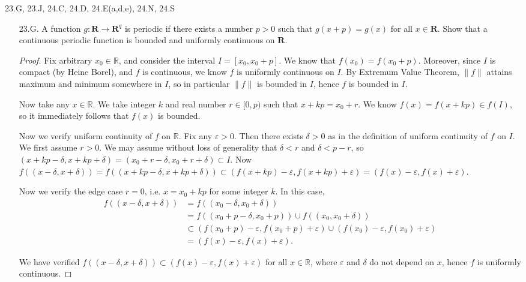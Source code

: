 
23.G, 23.J, 24.C, 24.D, 24.E(a,d,e), 24.N, 24.S
\begin{itemize}
	\item 
		[23.G.] A function $g: \boldsymbol{R} \rightarrow \boldsymbol{R}^q$ is periodic if there exists a number $p>0$ such that $g(x+p)=g(x)$ for all $x \in \boldsymbol{R}$. Show that a continuous periodic function is bounded and uniformly continuous on $\boldsymbol{R}$.
\begin{proof}
	Fix arbitrary $x_0 \in \mathbb{R}$, and consider the interval $I = [x_0, x_0+p]$. We know that $f(x_0) = f(x_0+p)$. Moreover, since $I$ is compact (by Heine Borel), and $f$ is continuous, we know $f$ is uniformly continuous on $I$. By Extremum Value Theorem, $\|f\|$ attains maximum and minimum somewhere in $I$, so in particular $\|f\|$ is bounded in $I$, hence $f$ is bounded in $I$. 

	Now take any $x \in \mathbb{R}$. We take integer $k$ and real number $r \in [0,p)$ such that $x + kp = x_0 + r$. We know $f(x) = f(x+kp) \in f(I)$, so it immediately follows that $f(x)$ is bounded.

	Now we verify uniform continuity of $f$ on $\mathbb{R}$. Fix any $\varepsilon>0$. Then there exists $\delta>0$ as in the definition of uniform continuity of $f$ on $I$. We first assume $r> 0$.  We may assume without loss of generality that $\delta<r$ and $\delta<p-r$, so 
	$(x+ kp - \delta, x+kp + \delta) = (x_0+r-\delta, x_0+r+\delta) \subset I$. 
	Now $f((x-\delta, x+\delta)) = f((x+kp-\delta, x+kp+\delta)) \subset \left( f(x+kp) - \varepsilon, f(x+kp) + \varepsilon \right)  = (f(x) - \varepsilon, f(x) + \varepsilon)$.

	Now we verify the edge case $r = 0$, i.e. $x = x_0 + kp $ for some integer $k$. In this case, 
	 \begin{align*}
		 f((x - \delta, x+\delta)) &= f((x_0 - \delta, x_0 + \delta)) \\
					 &= f((x_0 + p - \delta, x_0+p)) \cup f((x_0, x_0+\delta)) \\
					 &\subset (f(x_0+p) - \varepsilon, f(x_0+p) + \varepsilon) \cup (f(x_0) - \varepsilon, f(x_0)+\varepsilon)\\
					 &= (f(x) - \varepsilon, f(x)+\varepsilon)
	.\end{align*} 

	We have verified $f((x-\delta, x+\delta)) \subset (f(x)-\varepsilon, f(x)+\varepsilon)$ for all $x \in \mathbb{R}$, where $\varepsilon$ and $\delta$ do not depend on $x$, hence $f$ is uniformly continuous.
\end{proof}


\end{itemize}
